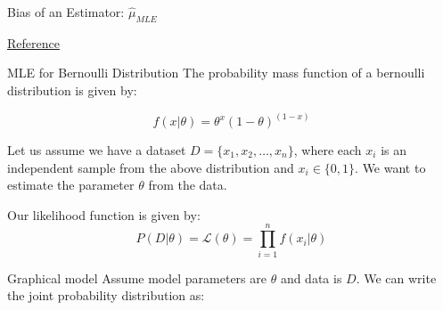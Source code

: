 \documentclass[handout]{beamer}
\begin{document}
    
\begin{frame}{Bias of an Estimator: $\hat{\mu}_{MLE}$}

    \href{https://online.stat.psu.edu/stat415/lesson/1/1.3}{Reference}
        
    
    

    
\end{frame}
\begin{frame}{MLE for Bernoulli Distribution}
    The probability mass function of a bernoulli distribution is given by:
    
    \begin{equation}
    f(x|\theta) = \theta^x(1-\theta)^{(1-x)}
    \end{equation}
    
    Let us assume we have a dataset $D = \{x_1, x_2, \ldots, x_n\}$, where each $x_i$ is an independent sample from the above distribution and $x_i\in\{0, 1\}$.
    We want to estimate the parameter $\theta$ from the data.
    
    Our likelihood function is given by:
    \begin{equation}
    P(D|\theta) = \mathcal{L}(\theta) = \prod_{i=1}^n f(x_i|\theta)
    \end{equation}
    \end{frame}



    \begin{frame}{Graphical model}
        Assume model parameters are $\theta$ and data is $D  $. We can write the joint probability distribution as:

        
    \end{frame}
    
\end{document}
